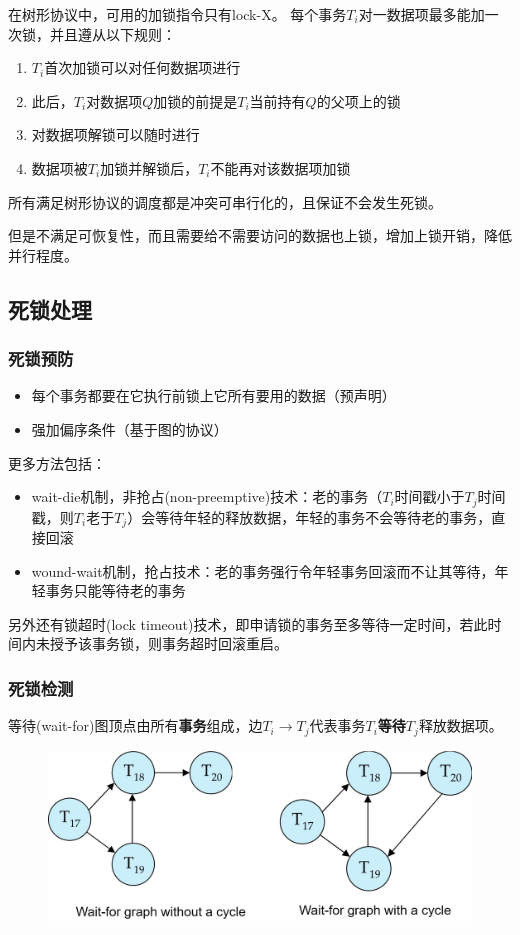 在树形协议中，可用的加锁指令只有lock-X。
每个事务$T_i$对一数据项最多能加一次锁，并且遵从以下规则：
\begin{enumerate}
	\item $T_i$首次加锁可以对任何数据项进行
	\item 此后，$T_i$对数据项$Q$加锁的前提是$T_i$当前持有$Q$的父项上的锁
	\item 对数据项解锁可以随时进行
	\item 数据项被$T_i$加锁并解锁后，$T_i$不能再对该数据项加锁
\end{enumerate}
所有满足树形协议的调度都是冲突可串行化的，且保证不会发生死锁。

但是不满足可恢复性，而且需要给不需要访问的数据也上锁，增加上锁开销，降低并行程度。

\subsection{死锁处理}
\subsubsection{死锁预防}
\begin{itemize}
	\item 每个事务都要在它执行前锁上它所有要用的数据（预声明）
	\item 强加偏序条件（基于图的协议）
\end{itemize}

更多方法包括：
\begin{itemize}
	\item wait-die机制，非抢占(non-preemptive)技术：老的事务（$T_i$时间戳小于$T_j$时间戳，则$T_i$老于$T_j$）会等待年轻的释放数据，年轻的事务不会等待老的事务，直接回滚
	\item wound-wait机制，抢占技术：老的事务强行令年轻事务回滚而不让其等待，年轻事务只能等待老的事务
\end{itemize}

另外还有锁超时(lock timeout)技术，即申请锁的事务至多等待一定时间，若此时间内未授予该事务锁，则事务超时回滚重启。

\subsubsection{死锁检测}
等待(wait-for)图顶点由所有\textbf{事务}组成，边$T_i\to T_j$代表事务$T_i$\textbf{等待}$T_j$释放数据项。
\begin{figure}[H]
\centering
\includegraphics[width=0.6\linewidth]{fig/wait-for_graph.png}
\end{figure}

